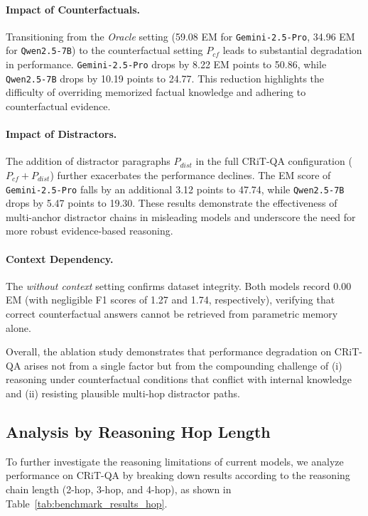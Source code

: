 \documentclass[10pt, a4paper]{article}
\begin{document}
\paragraph{Impact of Counterfactuals.} Transitioning from the \textit{Oracle} setting (59.08 EM for \texttt{Gemini-2.5-Pro}, 34.96 EM for \texttt{Qwen2.5-7B}) to the counterfactual setting $P_{cf}$ leads to substantial degradation in performance. \texttt{Gemini-2.5-Pro} drops by 8.22 EM points to 50.86, while \texttt{Qwen2.5-7B} drops by 10.19 points to 24.77. This reduction highlights the difficulty of overriding memorized factual knowledge and adhering to counterfactual evidence.

\paragraph{Impact of Distractors.} The addition of distractor paragraphs $P_{dist}$ in the full CRiT-QA configuration ($P_{cf}+P_{dist}$) further exacerbates the performance declines. The EM score of \texttt{Gemini-2.5-Pro} falls by an additional 3.12 points to 47.74, while \texttt{Qwen2.5-7B} drops by 5.47 points to 19.30. These results demonstrate the effectiveness of multi-anchor distractor chains in misleading models and underscore the need for more robust evidence-based reasoning.

\paragraph{Context Dependency.} The \textit{without context} setting confirms dataset integrity. Both models record 0.00 EM (with negligible F1 scores of 1.27 and 1.74, respectively), verifying that correct counterfactual answers cannot be retrieved from parametric memory alone. 

Overall, the ablation study demonstrates that performance degradation on CRiT-QA arises not from a single factor but from the compounding challenge of (i) reasoning under counterfactual conditions that conflict with internal knowledge and (ii) resisting plausible multi-hop distractor paths.


\subsection{Analysis by Reasoning Hop Length}
To further investigate the reasoning limitations of current models, we analyze performance on CRiT-QA by breaking down results according to the reasoning chain length (2-hop, 3-hop, and 4-hop), as shown in Table~\ref{tab:benchmark_results_hop}.
\end{document}
